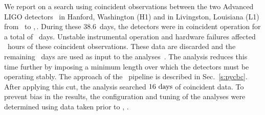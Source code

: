 We report on a search using coincident observations between the two Advanced
LIGO detectors~\cite{TheLIGOScientific:2014jea} in Hanford, Washington (H1) and in
Livingston, Louisiana (L1) from \OBSSTART\ to \OBSEND,\,\OBSYEAR. During these
$38.6$~days, the detectors were in coincident operation for a total of
\TotalAvailableCoincTime~days. Unstable instrumental operation and hardware
failures affected \CatOneVetoTime~hours of these coincident observations.
These data are discarded and the remaining \TotalCoincAfterCATOne~days are
used as input to the analyses~\cite{GW150914-DETCHAR}.  The \pycbc{} analysis reduces
this time further by imposing a minimum length over which the detectors must
be operating stably. The approach of the \pycbc{}\ pipeline is described
in Sec.~\ref{s:pycbc}.  After applying this cut, the \pycbc{} analysis
searched $16~\mathrm{days}$ of coincident data. To prevent bias in
the results, the configuration and tuning of the analyses were determined
using data taken prior to \OBSSTART, \OBSYEAR.

